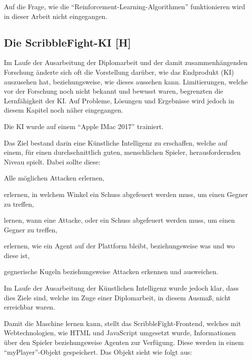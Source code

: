 Auf die Frage, wie die ``Reinforcement-Learning-Algorithmen'' funktionieren wird in dieser Arbeit nicht eingegangen.


\subsection{Die ScribbleFight-KI [H]}\label{maai:scribblefightki}

Im Laufe der Ausarbeitung der Diplomarbeit und der damit zusammenhängenden Forschung änderte sich oft die
Vorstellung darüber, wie das Endprodukt (KI) auszusehen hat, beziehungsweise, wie dieses aussehen kann.
Limitierungen, welche vor der Forschung noch nicht bekannt und bewusst waren, begrenzten die Lernfähigkeit der KI.
Auf Probleme, Lösungen und Ergebnisse wird jedoch in diesem Kapitel noch näher eingegangen.

Die KI wurde auf einem ``Apple IMac 2017'' trainiert.

Das Ziel bestand darin eine Künstliche Intelligenz zu erschaffen, welche auf einem, für einen durchschnittlich guten, menschlichen Spieler, herausfordernden Niveau spielt. Dabei sollte diese:
\begin{compactitem}
  \item Alle möglichen Attacken erlernen,
  \item erlernen, in welchem Winkel ein Schuss abgefeuert werden muss, um einen Gegner zu treffen,
  \item lernen, wann eine Attacke, oder ein Schuss abgefeuert werden muss, um einen Gegner zu treffen,
  \item erlernen, wie ein Agent auf der Plattform bleibt, beziehungsweise was und wo diese ist,
  \item gegnerische Kugeln beziehungsweise Attacken erkennen und ausweichen.
\end{compactitem}
Im Laufe der Ausarbeitung der Künstlichen Intelligenz wurde jedoch klar, dass dies Ziele sind, welche im Zuge einer Diplomarbeit, in diesem Ausmaß, nicht erreichbar waren. %

Damit die Maschine lernen kann, stellt das ScribbleFight-Frontend, welches mit Webtechnologien, wie HTML und JavaScript umgesetzt wurde, Informationen über den Spieler beziehungsweise Agenten zur Verfügung. Diese werden in einem ``myPlayer''-Objekt gespeichert. Das Objekt sieht wie folgt aus:

